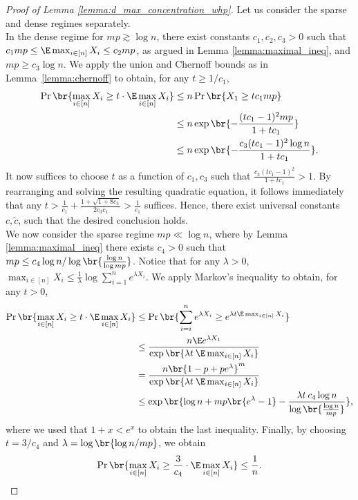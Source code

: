 \begin{proof}[Proof of Lemma \ref{lemma:d_max_concentration_whp}]
    Let us consider the sparse and dense regimes separately. \\
    \noindent
    In the dense regime for $mp \gtrsim \log n$, there exist constants $c_1, c_2, c_3 > 0$ such that $c_1 mp \leq \E \max_{i \in [n]} X_i\leq c_2 mp$, as argued in Lemma  \ref{lemma:maximal_ineq}, and $mp\geq c_3\log n$. We apply the union and Chernoff bounds as in Lemma~\ref{lemma:chernoff} to obtain, for any $t \geq 1/c_1$,
    \begin{align*}
        \Pr \br{\max_{i \in [n]}X_i \geq t \cdot \E \max_{i\in [n]} X_i} &\leq n \Pr\br{X_1 \geq t c_1 mp} \\
        &\leq n \exp\br{-\frac{(tc_1-1)^2mp}{1+tc_1}} \\
        &\leq  n \exp\br{-\frac{c_3(tc_1-1)^2 \log n}{1+tc_1}}.
    \end{align*}
    It now suffices to choose $t$ as a function of $c_1, c_3$ such that $\frac{c_3(tc_1-1)^2 }{1+tc_1} > 1$. By rearranging and solving the resulting quadratic equation, it follows immediately that any $t > \frac{1}{c_1} + \frac{1+\sqrt{1+8c_3}}{2c_3c_1} > \frac{1}{c_1}$ suffices. Hence, there exist universal constants $c, \tilde{c}$, such that the desired conclusion holds. \\
    \noindent
    We now consider the sparse regime $mp \ll \log n$, where by Lemma  \ref{lemma:maximal_ineq} there exists $c_4 > 0$ such that $mp \leq c_4 \log n / \log \br{\frac{\log n}{\log mp}}$. Notice that for any $\lambda > 0$, $\max_{i \in [n]}X_i \leq \frac{1}{\lambda} \log \sum_{i = 1}^n e^{\lambda X_i}$. We apply Markov's inequality to obtain, for any $t > 0$,
    \begin{align*}
        \Pr\br{\max_{i \in [n]}X_i\geq t \cdot  \E \max_{i \in [n]}X_i}  & \leq \Pr\br{\sum_{i = i}^n e^{\lambda X_i} \geq e^{\lambda t \E \max_{i \in [n]}X_i}} \\
        & \leq \frac{n \E e^{\lambda  X_1}}{\exp\br{\lambda  t \: \E \max_{i\in  [n]}X_i}} \\
        & = \frac{n\br{1-p+pe^{\lambda}}^m}{\exp\br{\lambda  t \:  \E \max_{i\in  [n]}X_i}} \\
        & \leq \exp\br{\log n + mp\br{e^{\lambda}-1}-\frac{\lambda t \: c_4 \log n}{\log\br{\frac{\log n}{mp}}}},
    \end{align*}
    where we used that $1 + x < e^x$ to obtain the last inequality. Finally, by choosing $t = 3/c_4$ and $\lambda = \log\br{\log n / mp}$, we obtain
    \begin{align*}
        \Pr\br{\max_{i \in [n]}X_i\geq \frac{3}{c_4} \cdot  \E \max_{i \in [n]}X_i} \leq \frac{1}{n}.
    \end{align*}
\end{proof}
%

